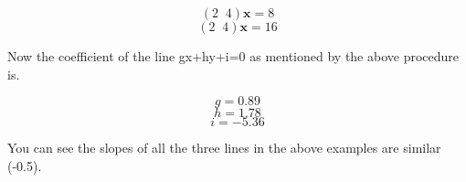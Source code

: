 \documentclass[journal,12pt,twocolumn]{IEEEtran}
\begin{document}
\begin{equation}
    (2\;\;4)\textbf{x} = 8
\end{equation}
\begin{equation}
    (2\;\;4)\textbf{x} = 16
\end{equation}

Now the coefficient of the line gx+hy+i=0 as mentioned by the above procedure is.

\begin{equation}
    g= 0.89
\end{equation}
\begin{equation}
    h= 1.78
\end{equation}
\begin{equation}
    i= -5.36
\end{equation}
 
You can see the slopes of all the three lines in the above examples are similar (-0.5).
\end{document}
